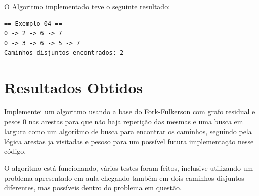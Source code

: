 O Algoritmo implementado teve o seguinte resultado:

\begin{scriptsize}
\estiloR
\begin{lstlisting}[title={Exemplo 04}, label=lst:javacode]
 == Exemplo 04 == 
0 -> 2 -> 6 -> 7
0 -> 3 -> 6 -> 5 -> 7
Caminhos disjuntos encontrados: 2 
\end{lstlisting}
\end{scriptsize}


\section{Resultados Obtidos}

Implementei um algoritmo usando a base do Fork-Fulkerson com grafo residual e pesos 0 nas arestas para que não haja repetição das mesmas e uma busca em largura como um algoritmo de busca para encontrar os caminhos, seguindo pela lógica arestas ja visitadas e pesoso para um possível futura implementação nesse código.

O algoritmo está funcionando, vários testes foram feitos, inclusive utilizando um problema apresentado em aula chegando também em dois caminhos disjuntos diferentes, mas possíveis dentro do problema em questão.
